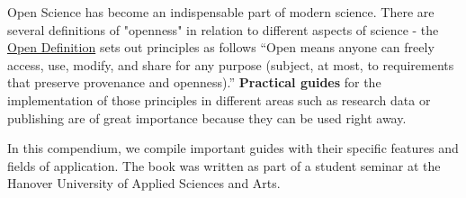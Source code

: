\documentclass{article}
\begin{document}
Open Science has become an indispensable part of modern science. There are several definitions of "openness" in relation to different aspects of science - the \href{https://opendefinition.org/}{Open Definition} sets out principles as follows “Open means anyone can freely access, use, modify, and share for any purpose (subject, at most, to requirements that preserve provenance and openness).” \textbf{Practical guides} for the implementation of those principles in different areas such as research data or publishing are of great importance because they can be used right away. 


In this compendium, we compile important guides with their specific features and fields of application. The book was written as part of a student seminar at the Hanover University of Applied Sciences and Arts.
\end{document}
